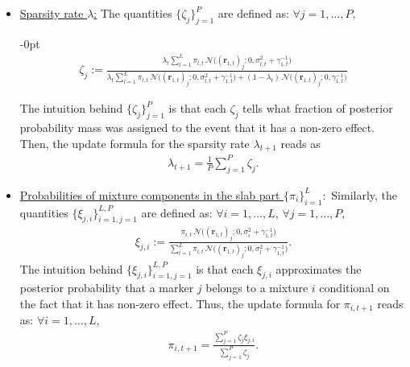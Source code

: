 \begin{itemize}
    \item \underline{Sparsity rate $\lambda$:} 
The quantities $\{\zeta_j \}_{j=1}^P$ are defined as: $\forall j=1, \dots, P,$
\begin{adjustwidth}{-\leftmargin}{0pt}
\begin{align}
    \label{em:mixture_probs}
    \zeta_j := \frac{\lambda_t \sum_{l=1}^L \pi_{l,t}\, \mathcal{N}\big((\bm{r}_{1,t})_j; 0, \sigma_{l,t}^2 + \gamma_{1,t}^{-1}\big)}{\lambda_t \sum_{l=1}^L \pi_{l,t}\, \mathcal{N}\big((\bm{r}_{1,t})_j; 0, \sigma_{l,t}^2 + \gamma_{1,t}^{-1}\big) + (1-\lambda_t)\, \mathcal{N}\big((\bm{r}_{1,t})_j; 0, \gamma_{1,t}^{-1}\big)}
\end{align}
\end{adjustwidth}
The intuition behind $\{\zeta_j\}_{j=1}^P$ is that each $\zeta_j$ tells what fraction of posterior probability mass was assigned to the event that it has a non-zero effect. Then, the update formula for the sparsity rate $\lambda_{t+1}$ reads as
\begin{align}
    \lambda_{t+1} = \frac{1}{P} \sum_{j=1}^P \zeta_j.
\end{align}
\item \underline{Probabilities of mixture components in the slab part $\{ \pi_{i} \} _{i=1}^L:$} Similarly, the quantities $\{\xi_{j,i}\}_{i=1, j=1}^{L,P}$ are defined as: $\forall i=1, \dots, L$, $\forall j=1,\dots, P$,
\begin{align}
    \xi_{j,i} := \frac{\pi_{i,t}\, \mathcal{N}\big((\bm{r}_{1,t})_j; 0, \sigma_i^2 + \gamma_{1,t}^{-1}\big)}{\sum_{l=1}^L \pi_{l,t}\, \mathcal{N}\big((\bm{r}_{1,t})_j; 0, \sigma_l^2 + \gamma_{1,t}^{-1}\big)}.
\end{align}
The intuition behind $\{\xi_{j,i}\}_{i=1, j=1}^{L,P}$ is that each $\xi_{j,i}$ approximates the posterior probability that a marker $j$ belongs to a mixture $i$ conditional on the fact that it has non-zero effect. Thus, the update formula for $\pi_{i,t+1}$ reads as: $\forall i=1,\dots, L$,
\begin{align}
    \pi_{i,t+1} = \frac{\sum_{j=1}^P \zeta_{j} \xi_{j,i}}{\sum_{j=1}^P \zeta_j}.
\end{align}


\end{itemize}
